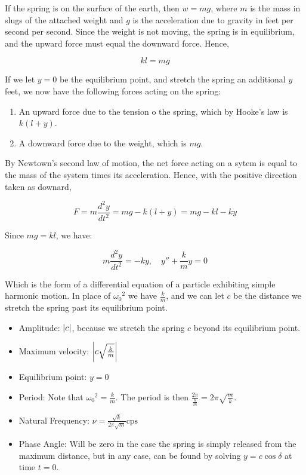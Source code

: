 \documentclass{article}
\begin{document}
If the spring is on the surface of the earth, then $w = mg$, where $m$ is the mass in slugs of the attached weight and $g$ is the acceleration due to gravity in feet per second per second. Since the weight is not moving, the spring is in equilibrium, and the upward force must equal the downward force. Hence,

\[ \tag{28.62} kl = mg \]

If we let $y = 0$ be the equilibrium point, and stretch the spring an additional $y$ feet, we now have the following forces acting on the spring:

\begin{enumerate}
\item An upward force due to the tension o the spring, which by Hooke's law is $k(l + y)$.
\item A downward force due to the weight, which is $mg$.
\end{enumerate}

By Newtown's second law of motion, the net force acting on a sytem is equal to the mass of the system times its acceleration. Hence, with the positive direction taken as downard,

\[ \tag{28.621} F = m \frac{d^2 y}{dt^2} = mg - k(l +y) = mg - kl - ky \]

Since $mg = kl$, we have:

\[ \tag{28.63} m \frac{d^2 y}{dt^2} = -ky, \quad y'' + \frac{k}{m}y = 0 \]

Which is the form of a differential equation of a particle exhibiting simple harmonic motion. In place of ${\omega_0}^2$ we have $\frac{k}{m}$, and we can let $c$ be the distance we stretch the spring past its equilibrium point.

\begin{itemize}
\item Amplitude: $\left| c \right|$, because we stretch the spring $c$ beyond its equilibrium point.
\item Maximum velocity: $\left| c \sqrt{\frac{k}{m}} \right|$
\item Equilibrium point: $y = 0$
\item Period: Note that ${\omega_0}^2 = \frac{k}{m}$. The period is then $\frac{2 \pi}{\frac{k}{m}} = 2 \pi \sqrt{\frac{m}{k}}$.
\item Natural Frequency: $\nu = \frac{\sqrt{k}}{2 \pi \sqrt{m}} \text{cps}$
\item Phase Angle: Will be zero in the case the spring is simply released from the maximum distance, but in any case, can be found by solving $y = c \cos{\delta}$ at time $t = 0$.
\end{itemize}
\end{document}
